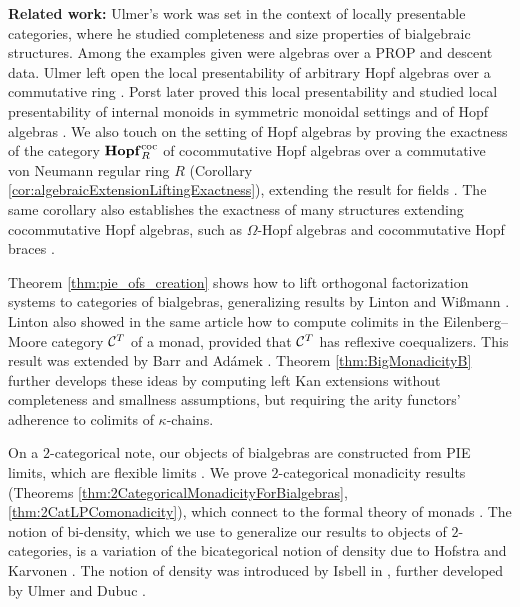 \smallskip
\noindent\textbf{Related work:}
Ulmer's work \cite{Ulmer1977Bialgebras} was set in the context of locally presentable categories, where he studied completeness and size properties of bialgebraic structures. Among the examples given were algebras over a PROP and descent data. Ulmer left open the local presentability of arbitrary Hopf algebras over a commutative ring \cite[4.6]{Ulmer1977Bialgebras}. Porst later proved this local presentability \cite{Porst-CoLimits} and studied local presentability of internal monoids in symmetric monoidal settings \cite{Porst01062008} and of Hopf algebras \cite{PorstHopfLocallyPresentable, Porst2}. We also touch on the setting of Hopf algebras by proving the exactness of the category $\mathbf{Hopf}_R^{\mathrm{coc}}$ of cocommutative Hopf algebras over a commutative von Neumann regular ring $R$ (Corollary \ref{cor:algebraicExtensionLiftingExactness}), extending the result for fields \cite{GRAN20194171}. The same corollary also establishes the exactness of many structures extending cocommutative Hopf algebras, such as $\Omega$-Hopf algebras \cite{bevilacquaCoalgebraicModelsOmega2026} and cocommutative Hopf braces \cite{granHopfBracesSemiabelian2026}. 

Theorem \ref{thm:pie_ofs_creation} shows how to lift orthogonal factorization systems to categories of bialgebras, generalizing results by Linton \cite{Linton1969} and Wi{\ss}mann \cite{Wissmann2022Minimality}. Linton also showed in the same article how to compute colimits in the Eilenberg--Moore category $\mathcal{C}^T$ of a monad, provided that $\mathcal{C}^T$ has reflexive coequalizers. This result was extended by Barr \cite{barrCoequalizersFreeTriples1970} and Ad\'{a}mek \cite{adamekColimitsAlgebrasRevisited1977}. Theorem \ref{thm:BigMonadicityB} further develops these ideas by computing left Kan extensions without completeness and smallness assumptions, but requiring the arity functors' adherence to colimits of $\kappa$-chains.

On a $2$-categorical note, our objects of bialgebras are constructed from PIE limits, which are flexible limits \cite{birdFlexibleLimits2categories1989}. We prove $2$-categorical monadicity results (Theorems \ref{thm:2CategoricalMonadicityForBialgebras}, \ref{thm:2CatLPComonadicity}), which connect to the formal theory of monads \cite{STREET1972149, lackFormalTheoryMonads2002}. The notion of bi-density, which we use to generalize our results to objects of $2$-categories, is a variation of the bicategorical notion of density due to Hofstra and Karvonen \cite{hofstraInnerAutoequivalencesGeneral2024}. The notion of density was introduced by Isbell in \cite{isbellAdequateSubcategories1960}, further developed by Ulmer \cite{ulmerPropertiesDenseRelative1968} and Dubuc \cite{dubuc1970}. 

